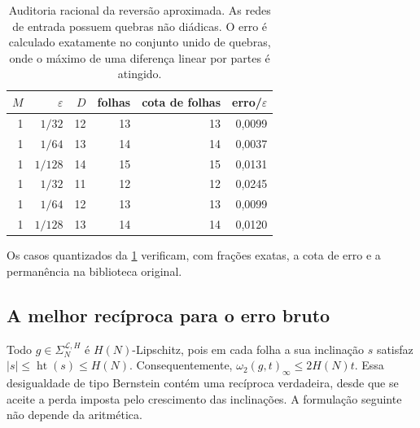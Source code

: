 \documentclass[12pt,a4paper]{article}
\theoremstyle{preciso}
\theoremstyle{definition}
\newcommand{\Library}{\mathcal{L}}
\newcommand{\height}{\operatorname{ht}}
\theoremstyle{preciso}
\theoremstyle{preciso}
\theoremstyle{preciso}
\theoremstyle{preciso}
\theoremstyle{definition}
\theoremstyle{preciso}
\theoremstyle{definition}
\theoremstyle{preciso}
\theoremstyle{preciso}
\theoremstyle{definition}
\begin{document}
\begin{table}[t]
 \centering
\caption{Auditoria racional da reversão aproximada. As redes de entrada
 possuem quebras não diádicas. O erro é calculado exatamente no conjunto
 unido de quebras, onde o máximo de uma diferença linear por partes é
 atingido.}\label{artigo_3:tab:approximate-reverse-audit}
\small
 \begin{tabular}{rrrrrr}
\toprule
$M$ & $\varepsilon$ & $D$ & folhas & cota de folhas & erro/$\varepsilon$\\
\midrule
1 & $1/32$ & 12 & 13 & 13 & 0{,}0099\\
1 & $1/64$ & 13 & 14 & 14 & 0{,}0037\\
1 & $1/128$ & 14 & 15 & 15 & 0{,}0131\\
1 & $1/32$ & 11 & 12 & 12 & 0{,}0245\\
1 & $1/64$ & 12 & 13 & 13 & 0{,}0099\\
1 & $1/128$ & 13 & 14 & 14 & 0{,}0120\\
\bottomrule
\end{tabular}
\end{table}

Os casos quantizados da \cref{artigo_3:tab:approximate-reverse-audit} verificam, com
frações exatas, a cota de erro e a permanência na biblioteca original.

\subsection{A melhor recíproca para o erro bruto}

Todo $g\in\Sigma_N^{\Library,H}$ é $H(N)$-Lipschitz, pois em cada folha a sua
inclinação $s$ satisfaz $|s|\le\height(s)\le H(N)$. Consequentemente,
$\omega_2(g,t)_\infty\le2H(N)t$. Essa desigualdade de tipo Bernstein contém
uma recíproca verdadeira, desde que se aceite a perda imposta pelo crescimento
das inclinações. A formulação seguinte não depende da aritmética.
\end{document}
